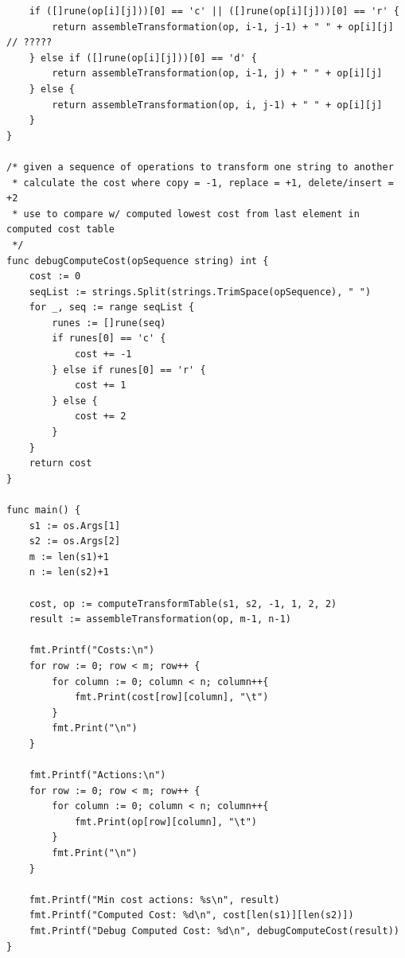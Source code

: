 \documentclass[12pt,letterpaper]{article}
\begin{document}
\begin{scriptsize}
\begin{verbatim}
    if ([]rune(op[i][j]))[0] == 'c' || ([]rune(op[i][j]))[0] == 'r' {
        return assembleTransformation(op, i-1, j-1) + " " + op[i][j] // ?????
    } else if ([]rune(op[i][j]))[0] == 'd' {
        return assembleTransformation(op, i-1, j) + " " + op[i][j]
    } else {
        return assembleTransformation(op, i, j-1) + " " + op[i][j]
    }
}

/* given a sequence of operations to transform one string to another
 * calculate the cost where copy = -1, replace = +1, delete/insert = +2
 * use to compare w/ computed lowest cost from last element in computed cost table
 */
func debugComputeCost(opSequence string) int {
    cost := 0
    seqList := strings.Split(strings.TrimSpace(opSequence), " ")
    for _, seq := range seqList {
        runes := []rune(seq)
        if runes[0] == 'c' {
            cost += -1
        } else if runes[0] == 'r' {
            cost += 1
        } else {
            cost += 2
        }
    }
    return cost
}

func main() {
    s1 := os.Args[1]
    s2 := os.Args[2]
    m := len(s1)+1
    n := len(s2)+1
	
    cost, op := computeTransformTable(s1, s2, -1, 1, 2, 2)
    result := assembleTransformation(op, m-1, n-1)

    fmt.Printf("Costs:\n")
    for row := 0; row < m; row++ {
        for column := 0; column < n; column++{
            fmt.Print(cost[row][column], "\t")
        }
        fmt.Print("\n")
    } 

    fmt.Printf("Actions:\n")
    for row := 0; row < m; row++ {
        for column := 0; column < n; column++{
            fmt.Print(op[row][column], "\t")
        }
        fmt.Print("\n")
    } 

    fmt.Printf("Min cost actions: %s\n", result)
    fmt.Printf("Computed Cost: %d\n", cost[len(s1)][len(s2)])
    fmt.Printf("Debug Computed Cost: %d\n", debugComputeCost(result))
}
        \end{verbatim}
    \end{scriptsize}

\pagebreak
\end{document}
